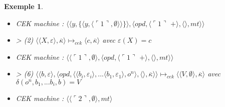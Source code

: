 \documentclass[10pt,a4paper]{report}
\newtheorem{ex}{Exemple}
\begin{document}
\begin{ex}
\begin{itemize}
			\item[] CEK machine : $\langle\langle y,\{\langle y,\langle\ulcorner 1\urcorner,\emptyset\rangle\rangle\}\rangle,\langle opd,\langle\ulcorner 1\urcorner$ $+\rangle,\langle\rangle,mt\rangle\rangle$
			\item[] > (2) $\langle\langle X,\varepsilon\rangle,\overline{\kappa}\rangle \longmapsto_{cek} \langle c,\overline{\kappa}\rangle$ avec $\varepsilon(X) = c$
			\item[] CEK machine : $\langle\langle\ulcorner 1\urcorner,\emptyset\rangle,\langle opd,\langle\ulcorner 1\urcorner$ $+\rangle,\langle\rangle,mt\rangle\rangle$
			\item[] > (6) $\langle  \langle b,\varepsilon\rangle,\langle opd,\langle \langle b_{i},\varepsilon_{i}\rangle,...\langle b_{1},\varepsilon_{1}\rangle ,o^{n}\rangle,\langle\rangle,\overline{\kappa}\rangle\rangle \longmapsto_{cek} \langle \langle V,\emptyset\rangle,\overline{\kappa}\rangle$ avec $\delta(o^{n},b_{1},...b_{i},b) = V$
			\item[] CEK machine : $\langle\langle\ulcorner 2\urcorner,\emptyset\rangle,mt\rangle$
		\end{itemize}
	\end{ex}
	\newpage
	
	
	
\end{document}
